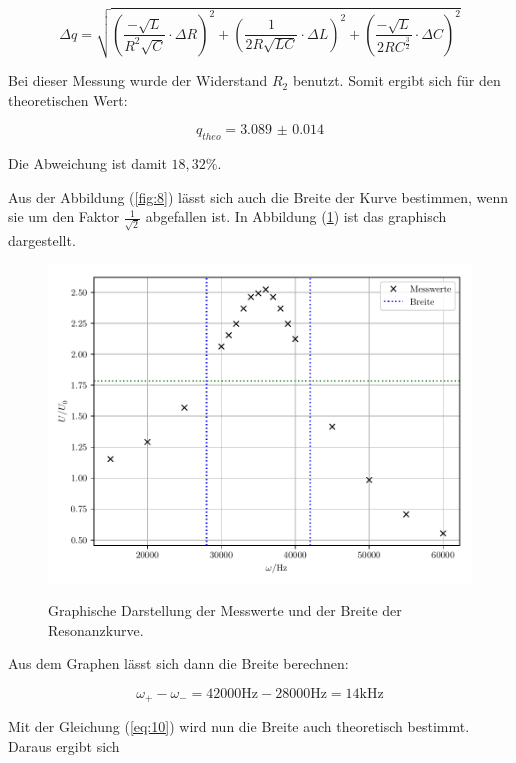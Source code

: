 \begin{equation*}
  \Delta q = \sqrt{\left( \frac{-\sqrt{L}}{R^2\sqrt{C}} \cdot \Delta R \right)^2 +
  \left( \frac{1}{2R\sqrt{LC}} \cdot \Delta L \right)^2 +
  \left( \frac{-\sqrt{L}}{2RC^{\frac{3}{2}}} \cdot \Delta C \right)^2}
\end{equation*}

Bei dieser Messung wurde der Widerstand $R_2$ benutzt. Somit ergibt sich für den theoretischen
Wert:

\begin{equation*}
  q_{theo} = \num{3.089(14)}
\end{equation*}

Die Abweichung ist damit $18,32\% $.

Aus der Abbildung (\ref{fig:8}) lässt sich auch die Breite der Kurve bestimmen, wenn sie
um den Faktor $\frac{1}{\sqrt{2}}$ abgefallen ist. In Abbildung (\ref{fig:9}) ist das
graphisch dargestellt.

\begin{figure}[H]
  \centering
  \caption{Graphische Darstellung der Messwerte und der Breite der Resonanzkurve.}
  \includegraphics[width=\textwidth]{plot3.pdf}
  \label{fig:9}
\end{figure}

Aus dem Graphen lässt sich dann die Breite berechnen:

\begin{equation*}
  \omega_+ - \omega_- = 42000 \si{\Hz} - 28000 \si{\Hz} = 14 \si{\kilo\Hz}
\end{equation*}

Mit der Gleichung (\ref{eq:10}) wird nun die Breite auch theoretisch bestimmt. Daraus ergibt sich

